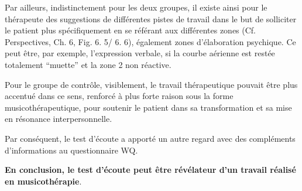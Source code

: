  Par ailleurs, indistinctement pour les deux
 groupes, il existe ainsi pour le thérapeute des
 suggestions de différentes pistes de travail dans le but de
 solliciter le patient plus spécifiquement en se référant aux
              différentes zones (Cf. Perspectives, Ch. 6, Fig. 6. 5/ 6. 6), également zones
 d'élaboration psychique. Ce peut être, par exemple,
              l'expression verbale, si la courbe aérienne est restée
              totalement ``muette'' et la zone 2 non
              réactive.

              Pour le groupe de contrôle, visiblement, le travail
                thérapeutique pouvait être plus accentué dans ce
                sens, renforcé à plus forte raison sous la forme musicothérapeutique, pour soutenir le
                patient dans sa transformation et sa mise en résonance
                interpersonnelle.


                Par conséquent,  le test d'écoute a
                apporté un autre regard avec des compléments d'informations au questionnaire
                WQ.

                \textbf{ En conclusion, le test
                d'écoute peut être \textbf{révélateur d'un
                travail réalisé en musicothérapie}}.






















































































